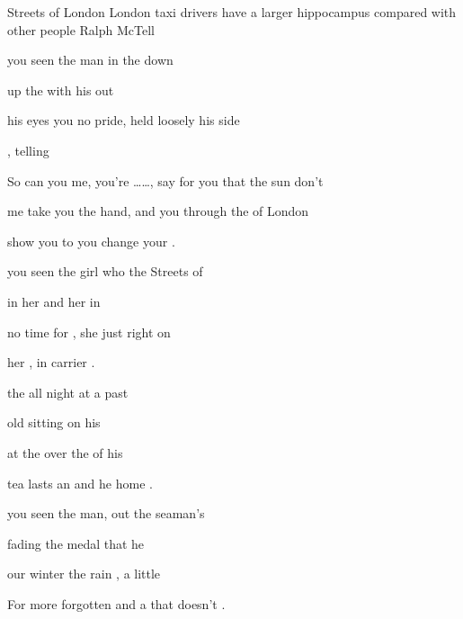 \begin{SBSong}{Streets of London}
  {London taxi drivers have a larger hippocampus compared with other people}
  {Ralph McTell}
  \begin{SBVerse}
	 you seen the  man in the  down 
	
	 up the  with his  out 
	
	 his eyes you  no pride,  held loosely  his side 
	
	 , telling  
  \end{SBVerse}
  \begin{SBChorus}
	So  can you  me, you're \ldots{}\ldots{}, 
	\CBLineBrk{} say for you that the sun don't 
	
	 me take you  the hand, and  you through the  of London
	
	 show you  to  you change your .
  \end{SBChorus}
  \begin{SBVerse}
	 you seen the  girl who  the Streets of 
	
	 in her  and her  in 
	
	 no time for , she just  right on 
	
	 her , in  carrier .
  \end{SBVerse}
  \begin{SBVerse}
	 the all night  at a  past 
	
	 old  sitting  on his 
	
	 at the  over the  of his 
	
	 tea lasts an  and he  home .
  \end{SBVerse}
  \begin{SBVerse}
	 you seen the  man, out  the seaman's 
	
	 fading  the medal  that he 
	
	 our winter  the rain , a little 
	
	For  more forgotten  and a  that doesn't .
  \end{SBVerse}
\end{SBSong}

